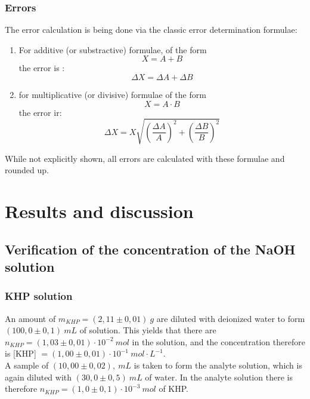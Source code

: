 \documentclass[twocolumn]{article}
\begin{document}
\subsubsection{Errors}
The error calculation is being done via the classic error determination formulae:
\begin{enumerate}
    \item For additive (or substractive) formulae, of the form \[ X = A + B\] the error is : \[\Delta X = \Delta A + \Delta B\]
    \item for multiplicative (or divisive) formulae of the form \[X = A \cdot  B\] the error ir: \[  \Delta X = X\sqrt{\left(\frac{\Delta A}{A}\right)^2+\left(\frac{\Delta B}{B}\right)^2} \]
\end{enumerate}
While not explicitly shown, all errors are calculated with these formulae and rounded up.
\section{Results and discussion}
\subsection{Verification of the concentration of the NaOH solution}
\subsubsection{KHP solution}
An amount of $m_{KHP}=(2,11 \pm 0,01) \ g$ are diluted with deionized water to form $(100,0 \pm 0,1) \ mL$ of solution. This yields that there are $n_{KHP} = (1,03 \pm 0,01) \cdot 10^{-2} \ mol$ in the solution, and the concentration therefore is [KHP] $= (1,00 \pm 0,01 ) \cdot 10^{-1} \ mol \cdot L ^ {-1}$. \\
A sample of $(10,00 \pm 0,02), \ mL$ is taken to form the analyte solution, which is again diluted with $(30,0 \pm 0,5) \ mL$ of water. In the analyte solution there is therefore $n_{KHP} = (1,0 \pm 0,1) \cdot 10^{-3} \ mol$ of KHP.
\end{document}
